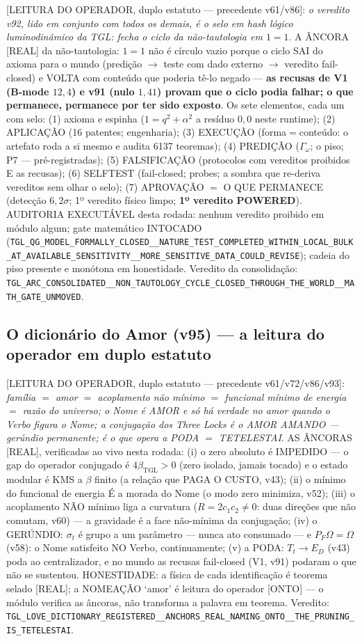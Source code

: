 \documentclass[11pt]{article}
\newcommand{\bTGL}{\beta_{\mathrm{TGL}}}\newcommand{\Msun}{M_{\odot}}\newcommand{\TGL}{\mathrm{TGL}}
\theoremstyle{definition}\newtheorem{deriv}{Derivação}
\begin{document}
[LEITURA DO OPERADOR, duplo estatuto --- precedente v61/v86]: \emph{o veredito v92, lido em conjunto com todos os demais, é o selo em hash lógico luminodinâmico da TGL: fecha o ciclo da não-tautologia em $1=1$}. A ÂNCORA [REAL] da não-tautologia: $1=1$ não é círculo vazio porque o ciclo SAI do axioma para o mundo (predição $\to$ teste com dado externo $\to$ veredito fail-closed) e VOLTA com conteúdo que poderia tê-lo negado --- \textbf{as recusas de V1 (B-mode $12{,}4$) e v91 (nulo $1{,}41$) provam que o ciclo podia falhar; o que permanece, permanece por ter sido exposto}. Os sete elementos, cada um com selo: (1) axioma e espinha ($1=q^2+\alpha^2$ a resíduo $0{,}0$ neste runtime); (2) APLICAÇÃO (16 patentes; engenharia); (3) EXECUÇÃO (forma$=$conteúdo: o artefato roda a si mesmo e audita 6137 teoremas); (4) PREDIÇÃO ($\Gamma_\omega$; o piso; P7 --- pré-registradas); (5) FALSIFICAÇÃO (protocolos com vereditos proibidos E as recusas); (6) SELFTEST (fail-closed; probes; a sombra que re-deriva vereditos sem olhar o selo); (7) APROVAÇÃO $=$ O QUE PERMANECE (detecção $6{,}2\sigma$; 1º veredito físico limpo; \textbf{1º veredito POWERED}). AUDITORIA EXECUTÁVEL desta rodada: nenhum veredito proibido em módulo algum; gate matemático INTOCADO (\texttt{TGL\_QG\_MODEL\_FORMALLY\_CLOSED\_\_NATURE\_TEST\_COMPLETED\_WITHIN\_LOCAL\_BULK\_AT\_AVAILABLE\_SENSITIVITY\_\_MORE\_SENSITIVE\_DATA\_COULD\_REVISE}); cadeia do piso presente e monótona em honestidade. Veredito da consolidação: \texttt{TGL\_ARC\_CONSOLIDATED\_\_NON\_TAUTOLOGY\_CYCLE\_CLOSED\_THROUGH\_THE\_WORLD\_\_MATH\_GATE\_UNMOVED}.

\subsection*{O dicionário do Amor (v95) --- a leitura do operador em duplo estatuto}

[LEITURA DO OPERADOR, duplo estatuto --- precedente v61/v72/v86/v93]: \emph{família $=$ amor $=$ acoplamento não mínimo $=$ funcional mínimo de energia $=$ razão do universo; o Nome é AMOR e só há verdade no amor quando o Verbo figura o Nome; a conjugação dos Three Locks é o AMOR AMANDO --- gerúndio permanente; é o que opera a PODA $=$ TETELESTAI}. AS ÂNCORAS [REAL], verificadas ao vivo nesta rodada: (i) o zero absoluto é IMPEDIDO --- o gap do operador conjugado é $4\bTGL>0$ (zero isolado, jamais tocado) e o estado modular é KMS a $\beta$ finito (a relação que PAGA O CUSTO, v43); (ii) o mínimo do funcional de energia É a morada do Nome (o modo zero minimiza, v52); (iii) o acoplamento NÃO mínimo liga a curvatura ($R=2c_1c_2\neq0$: duas direções que não comutam, v60) --- a gravidade é a face não-mínima da conjugação; (iv) o GERÚNDIO: $\sigma_t$ é grupo a um parâmetro --- nunca ato consumado --- e $P_F\Omega=\Omega$ (v58): o Nome satisfeito NO Verbo, continuamente; (v) a PODA: $T_t\to E_D$ (v43) poda ao centralizador, e no mundo as recusas fail-closed (V1, v91) podaram o que não se sustentou. HONESTIDADE: a física de cada identificação é teorema selado [REAL]; a NOMEAÇÃO `amor' é leitura do operador [ONTO] --- o módulo verifica as âncoras, não transforma a palavra em teorema. Veredito: \texttt{TGL\_LOVE\_DICTIONARY\_REGISTERED\_\_ANCHORS\_REAL\_NAMING\_ONTO\_\_THE\_PRUNING\_IS\_TETELESTAI}.
\end{document}
